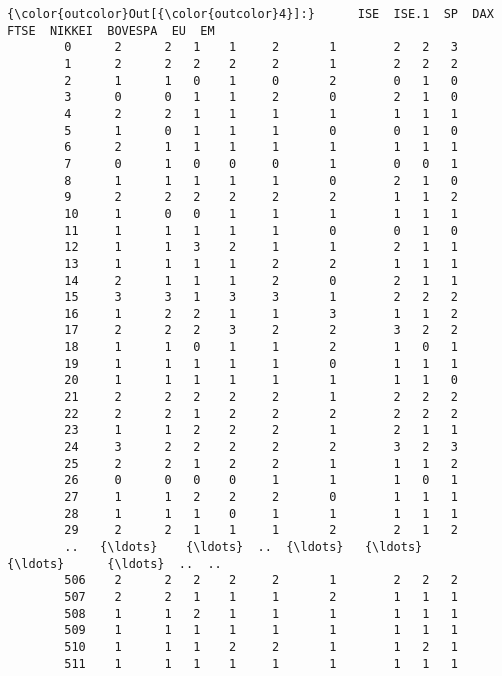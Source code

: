 \documentclass[11pt]{article}
\begin{document}
\begin{Verbatim}[commandchars=\\\{\}]
{\color{outcolor}Out[{\color{outcolor}4}]:}      ISE  ISE.1  SP  DAX  FTSE  NIKKEI  BOVESPA  EU  EM
        0      2      2   1    1     2       1        2   2   3
        1      2      2   2    2     2       1        2   2   2
        2      1      1   0    1     0       2        0   1   0
        3      0      0   1    1     2       0        2   1   0
        4      2      2   1    1     1       1        1   1   1
        5      1      0   1    1     1       0        0   1   0
        6      2      1   1    1     1       1        1   1   1
        7      0      1   0    0     0       1        0   0   1
        8      1      1   1    1     1       0        2   1   0
        9      2      2   2    2     2       2        1   1   2
        10     1      0   0    1     1       1        1   1   1
        11     1      1   1    1     1       0        0   1   0
        12     1      1   3    2     1       1        2   1   1
        13     1      1   1    1     2       2        1   1   1
        14     2      1   1    1     2       0        2   1   1
        15     3      3   1    3     3       1        2   2   2
        16     1      2   2    1     1       3        1   1   2
        17     2      2   2    3     2       2        3   2   2
        18     1      1   0    1     1       2        1   0   1
        19     1      1   1    1     1       0        1   1   1
        20     1      1   1    1     1       1        1   1   0
        21     2      2   2    2     2       1        2   2   2
        22     2      2   1    2     2       2        2   2   2
        23     1      1   2    2     2       1        2   1   1
        24     3      2   2    2     2       2        3   2   3
        25     2      2   1    2     2       1        1   1   2
        26     0      0   0    0     1       1        1   0   1
        27     1      1   2    2     2       0        1   1   1
        28     1      1   1    0     1       1        1   1   1
        29     2      2   1    1     1       2        2   1   2
        ..   {\ldots}    {\ldots}  ..  {\ldots}   {\ldots}     {\ldots}      {\ldots}  ..  ..
        506    2      2   2    2     2       1        2   2   2
        507    2      2   1    1     1       2        1   1   1
        508    1      1   2    1     1       1        1   1   1
        509    1      1   1    1     1       1        1   1   1
        510    1      1   1    2     2       1        1   2   1
        511    1      1   1    1     1       1        1   1   1

\end{Verbatim}
\end{document}
